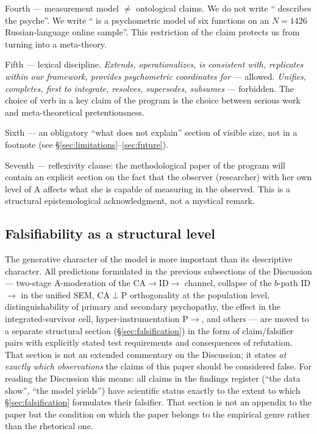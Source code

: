 Fourth --- measurement model $\neq$ ontological claims. We do not write ``\DEIC{} describes the psyche''. We write ``\DEIC{} is a psychometric model of six functions on an $N = 1426$ Russian-language online sample''. This restriction of the claim protects us from turning into a meta-theory.

Fifth --- lexical discipline. \emph{Extends, operationalizes, is consistent with, replicates within our framework, provides psychometric coordinates for} --- allowed. \emph{Unifies, completes, first to integrate, resolves, supersedes, subsumes} --- forbidden. The choice of verb in a key claim of the program is the choice between serious work and meta-theoretical pretentiousness.

Sixth --- an obligatory ``what \DEIC{} does not explain'' section of visible size, not in a footnote (see §\ref{sec:limitations}--\ref{sec:future}).

Seventh --- reflexivity clause: the methodological paper of the program will contain an explicit section on the fact that the observer (researcher) with her own level of A affects what she is capable of measuring in the observed. This is a structural epistemological acknowledgment, not a mystical remark.

\subsection{Falsifiability as a structural level}
\label{subsec:falsifiers}

The generative character of the model is more important than its descriptive character. All predictions formulated in the previous subsections of the Discussion --- two-stage A-moderation of the CA$\to$ID$\to$\EAF{} channel, collapse of the $b$-path ID$\to$\EAF{} in the unified SEM, CA$\perp$P orthogonality at the population level, distinguishability of primary and secondary psychopathy, the \EAF{} effect in the integrated-survivor cell, hyper-instrumentation P$\to$\Ecog{}, and others --- are moved to a separate structural section (§\ref{sec:falsification}) in the form of claim/falsifier pairs with explicitly stated test requirements and consequences of refutation. That section is not an extended commentary on the Discussion; it states \emph{at exactly which observations} the claims of this paper should be considered false. For reading the Discussion this means: all claims in the findings register (``the data show'', ``the model yields'') have scientific status exactly to the extent to which §\ref{sec:falsification} formulates their falsifier. That section is not an appendix to the paper but the condition on which the paper belongs to the empirical genre rather than the rhetorical one.


